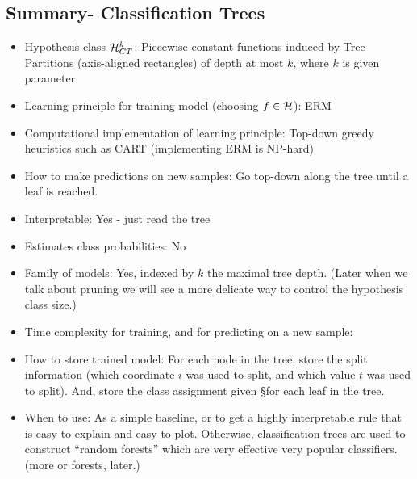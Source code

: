 \subsection{Summary- Classification Trees}
\begin{itemize}
  \item Hypothesis class $\mathcal{H}^k_{CT}$: Piecewise-constant functions induced by Tree
    Partitions (axis-aligned rectangles) of depth at most $k$, where $k$ is
    given parameter
       \item Learning principle for training model (choosing $f\in\mathcal{H}$): ERM
	     \item Computational implementation of learning principle:
	       Top-down greedy heuristics such as CART (implementing ERM is
	       NP-hard)
  \item How to make predictions on new samples:  Go top-down along the tree
    until a leaf is reached. 
  \item Interpretable: Yes - just read the tree 
    \item Estimates class probabilities: No 
    \item Family of models: Yes, indexed by $k$ the maximal tree depth. (Later
	when we talk about pruning we will see a more delicate way to control
      the hypothesis class size.)
       \item Time complexity for training, and for predicting on a new sample:
  \item How to store trained model: For each node in the tree, store the split
    information (which coordinate $i$ was used to split, and which value $t$ was used to
    split). And, store the class assignment given §for each leaf in the tree.
    \item When to use: As a simple baseline, or to get a highly interpretable
      rule that is easy to explain and easy to plot. 
      Otherwise, classification trees are used to construct ``random forests''
      which are very effective very popular classifiers. (more or forests,
      later.)
\end{itemize}


% 


